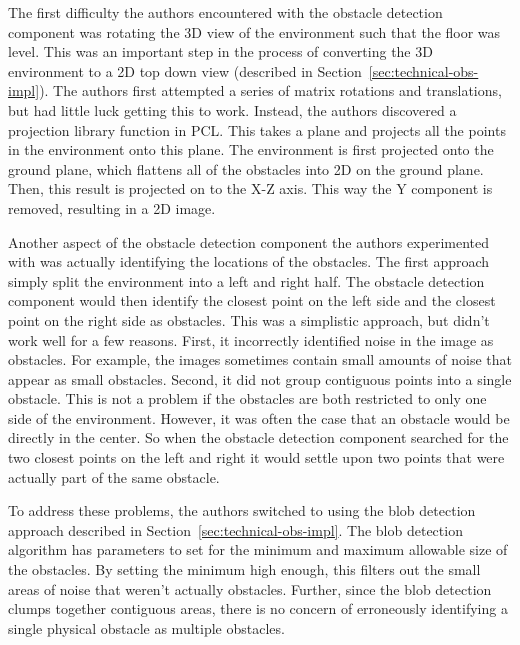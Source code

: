 The first difficulty the authors encountered with the obstacle detection
component was rotating the 3D view of the environment such that the floor was
level. This was an important step in the process of converting the 3D
environment to a 2D top down view (described in
Section~\ref{sec:technical-obs-impl}). The authors first attempted a series of
matrix rotations and translations, but had little luck getting this to work.
Instead, the authors discovered a projection library function in PCL. This takes
a plane and projects all the points in the environment onto this plane. The
environment is first projected onto the ground plane, which flattens all of the
obstacles into 2D on the ground plane. Then, this result is projected on to the
X-Z axis. This way the Y component is removed, resulting in a 2D image.

Another aspect of the obstacle detection component the authors experimented with
was actually identifying the locations of the obstacles. The first approach
simply split the environment into a left and right half. The obstacle detection
component would then identify the closest point on the left side and the
closest point on the right side as obstacles. This was a simplistic approach,
but didn't work well for a few reasons. First, it incorrectly identified noise in
the image as obstacles. For example, the images sometimes contain small amounts of noise
that appear as small obstacles. Second, it did not group contiguous points into
a single obstacle. This is not a problem if the obstacles are both restricted to
only one side of the environment. However, it was often the case that an
obstacle would be directly in the center. So when the obstacle detection component
searched for the two closest points on the left and right it would settle upon
two points that were actually part of the same obstacle.

To address these problems, the authors switched to using the blob detection
approach described in Section~\ref{sec:technical-obs-impl}. The blob detection
algorithm has parameters to set for the minimum and maximum allowable size of
the obstacles. By setting the minimum high enough, this filters out the
small areas of noise that weren't actually obstacles. Further, since the blob
detection clumps together contiguous areas, there is no concern of erroneously
identifying a single physical obstacle as multiple obstacles.


